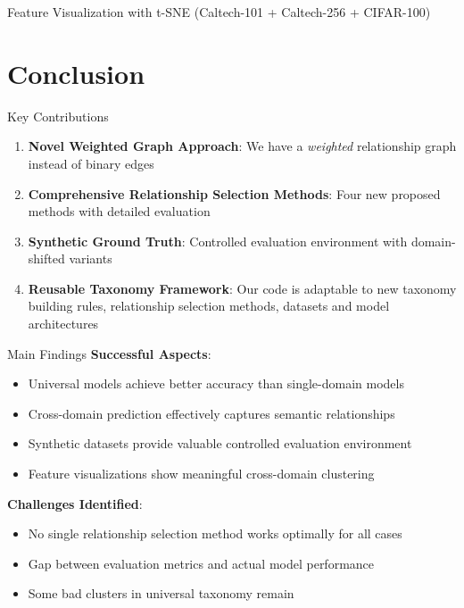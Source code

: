 \documentclass[aspectratio=169]{beamer}
\begin{document}
\begin{frame}{Feature Visualization with t-SNE (Caltech-101 + Caltech-256 + CIFAR-100)}
    \begin{center}
        \resizebox{0.65\textwidth}{!}{}
    \end{center}
\end{frame}

\section{Conclusion}

\begin{frame}{Key Contributions}
    \begin{enumerate}
        \item \textbf{Novel Weighted Graph Approach}: We have a \textit{weighted} relationship graph instead of binary edges

        \item \textbf{Comprehensive Relationship Selection Methods}: Four new proposed methods with detailed evaluation

        \item \textbf{Synthetic Ground Truth}: Controlled evaluation environment with domain-shifted variants

        \item \textbf{Reusable Taxonomy Framework}: Our code is adaptable to new taxonomy building rules,
              relationship selection methods, datasets and model architectures
    \end{enumerate}
\end{frame}

\begin{frame}{Main Findings}
    \textbf{Successful Aspects}:
    \begin{itemize}
        \item Universal models achieve better accuracy than single-domain models
        \item Cross-domain prediction effectively captures semantic relationships
        \item Synthetic datasets provide valuable controlled evaluation environment
        \item Feature visualizations show meaningful cross-domain clustering
    \end{itemize}

    \vspace{1em}

    \textbf{Challenges Identified}:
    \begin{itemize}
        \item No single relationship selection method works optimally for all cases
        \item Gap between evaluation metrics and actual model performance
        \item Some bad clusters in universal taxonomy remain
    \end{itemize}
\end{frame}
\end{document}
